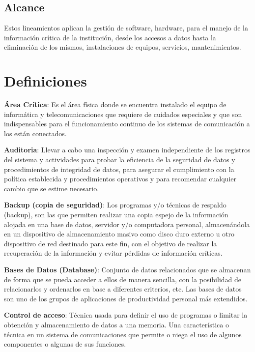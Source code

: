 \documentclass{book}
\begin{document}
        \section{Alcance}
            Estos lineamientos aplican la gestión de software, hardware,
            para el manejo de la información crítica de la institución,
            desde los accesos a datos hasta la eliminación de los mismos, instalaciones de
            equipos, servicios, mantenimientos.
        \
    \

    \chapter{Definiciones}
        \textbf{Área Crítica}: Es el área física donde se encuentra instalado el equipo de
        informática y telecomunicaciones que requiere de cuidados especiales y que son
        indispensables para el funcionamiento continuo de los sistemas de comunicación a los
        están conectados.

        \textbf{Auditoria}: Llevar a cabo una inspección y examen independiente de los registros
        del sistema y actividades para probar la eficiencia de la seguridad de datos y
        procedimientos de integridad de datos, para asegurar el cumplimiento con la política
        establecida y procedimientos operativos y para recomendar cualquier cambio que se
        estime necesario.

        \textbf{Backup (copia de seguridad)}: Los programas y/o técnicas de respaldo (backup),
        son las que permiten realizar una copia espejo de la información alojada en una base de
        datos, servidor y/o computadora personal, almacenándola en un dispositivo de
        almacenamiento masivo como disco duro externo u otro dispositivo de red destinado
        para este fin, con el objetivo de realizar la recuperación de la información y evitar
        pérdidas de información críticas.

        \textbf{Bases de Datos (Database)}: Conjunto de datos relacionados que se almacenan de
        forma que se pueda acceder a ellos de manera sencilla, con la posibilidad de
        relacionarlos y ordenarlos en base a diferentes criterios, etc. Las bases de datos son uno
        de los grupos de aplicaciones de productividad personal más extendidos.

        \textbf{Control de acceso}: Técnica usada para definir el uso de programas o limitar la
        obtención y almacenamiento de datos a una memoria. Una característica o técnica en un
        sistema de comunicaciones que permite o niega el uso de algunos componentes o
        algunas de sus funciones.
\end{document}

